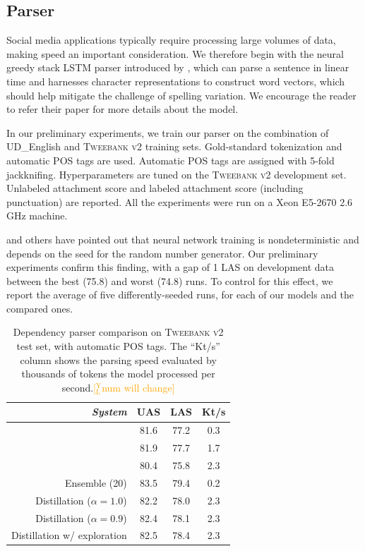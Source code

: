 \documentclass[11pt,a4paper]{article}
\newcommand{\yjcomment}[1]{\textcolor{orange}{[$_\mathrm{L}^\mathrm{Y}$#1]}}
\begin{document}
\subsection{Parser}

Social media applications typically require processing large volumes
of data, making speed an important consideration. We therefore 
begin with the neural greedy stack LSTM parser introduced by ,
which can parse a sentence in linear time and harnesses 
character representations to construct word vectors, which should help mitigate the challenge of
spelling variation. We encourage the reader to refer their paper for
more details about the model.

In our preliminary experiments, we train our parser on the combination of UD\_English
and \textsc{Tweebank v2} training sets. Gold-standard tokenization and automatic POS
tags are used. Automatic POS tags are assigned with 5-fold
jackknifing. Hyperparameters %
are tuned on the \textsc{Tweebank v2} development set. Unlabeled attachment score and
labeled attachment score (including punctuation) are reported.
All the experiments were run on a Xeon E5-2670 2.6 GHz machine.

\citet{reimers-gurevych:2017:EMNLP2017} and others have
pointed out that neural network training is 
nondeterministic and depends on the seed for the random
number generator.
Our preliminary experiments confirm this finding, with a gap of 1 LAS on development data
between the best (75.8)
 and worst (74.8) runs. To control for this
effect, we report the average of five differently-seeded runs, for
each of our models and the compared ones.

\begin{table}[t]
	\centering
	\begin{tabular}{rccc}
		\hline
		\it System & UAS & LAS & Kt/s \\
		\hline
		\citet{kong-EtAl:2014:EMNLP2014} &81.6 & 77.2 & 0.3 \\
		\citet{dozat-qi-manning:2017:K17-3} & 81.9 &  77.7 & 1.7 \\
		\newcite{ballesteros-EtAl:2016:EMNLP2016} & 80.4 & 75.8 & 2.3 \\
		\hdashline
		Ensemble (20) & 83.5 & 79.4 & 0.2 \\
		Distillation ($\alpha =1.0$) & 82.2 & 78.0 & 2.3 \\
		Distillation ($\alpha =0.9$) & 82.4 & 78.1 & 2.3 \\		
		Distillation w/ exploration & 82.5 & 78.4 & 2.3 \\
		\hline
	\end{tabular}
	\caption{Dependency parser comparison on \textsc{Tweebank v2} test set,
           with automatic POS tags. The ``Kt/s'' column shows
           the parsing speed evaluated by thousands of tokens
           the model processed per second.\yjcomment{num will change}
            \label{tbl:parse-result}}
\end{table}
\end{document}
